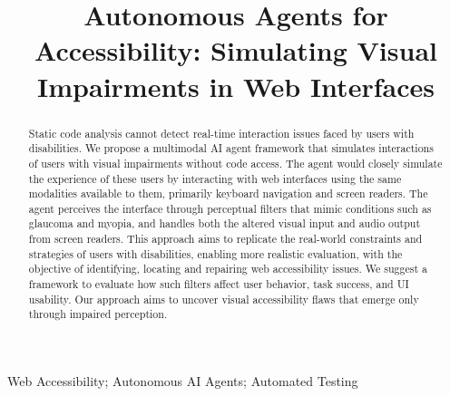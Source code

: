 \documentclass[10pt, conference]{IEEEtran}
\begin{document}
\title{Autonomous Agents for Accessibility: Simulating Visual Impairments in Web Interfaces}

\author{
\and
{}
}

\maketitle

\begin{abstract}
Static code analysis cannot detect real-time interaction issues faced by users with disabilities. We propose a multimodal \ac{AI} agent framework that simulates interactions of users with visual impairments without code access. 
The agent would closely simulate the experience of these users by interacting with web interfaces using the same modalities available to them, primarily keyboard navigation and screen readers. The agent perceives the interface through perceptual filters that mimic conditions such as glaucoma and myopia, and handles both the altered visual input and audio output from screen readers. 
This approach aims to replicate the real-world constraints and strategies of users with disabilities, enabling more realistic evaluation, with the objective of identifying, locating and repairing web accessibility issues. 
We suggest a framework to evaluate how such filters affect user behavior, task success, and \ac{UI} usability. Our approach aims to uncover visual accessibility flaws that emerge only through impaired perception. 
\end{abstract}

\begin{IEEEkeywords}
Web Accessibility; Autonomous \ac{AI} Agents; Automated Testing
\end{IEEEkeywords}









\balance


\end{document}
